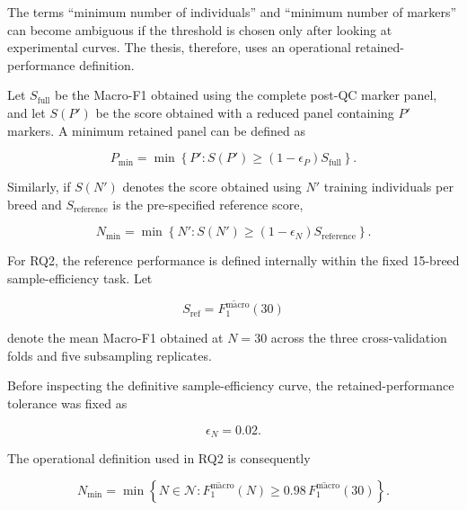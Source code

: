 The terms ``minimum number of individuals'' and ``minimum number of
markers'' can become ambiguous if the threshold is chosen only after
looking at experimental curves. The thesis, therefore, uses an
operational retained-performance definition.

Let $S_{\mathrm{full}}$ be the Macro-F1 obtained using the complete
post-QC marker panel, and let $S(P')$ be the score obtained with a
reduced panel containing $P'$ markers. A minimum retained panel can be
defined as

\begin{equation}
    P_{\min}
    =
    \min
    \left\{
        P':
        S(P')
        \geq
        (1-\epsilon_P)
        S_{\mathrm{full}}
    \right\}.
    \label{eq:minimum_marker_definition}
\end{equation}

Similarly, if $S(N')$ denotes the score obtained using $N'$ training
individuals per breed and $S_{\mathrm{reference}}$ is the pre-specified
reference score,

\begin{equation}
    N_{\min}
    =
    \min
    \left\{
        N':
        S(N')
        \geq
        (1-\epsilon_N)
        S_{\mathrm{reference}}
    \right\}.
    \label{eq:minimum_sample_definition}
\end{equation}

For RQ2, the reference performance is defined internally within the
fixed 15-breed sample-efficiency task. Let

\begin{equation}
    S_{\mathrm{ref}}
    =
    \overline{F_1^{\mathrm{macro}}}(30)
\end{equation}

denote the mean Macro-F1 obtained at $N=30$ across the three
cross-validation folds and five subsampling replicates.

Before inspecting the definitive sample-efficiency curve, the
retained-performance tolerance was fixed as

\begin{equation}
    \epsilon_N = 0.02.
\end{equation}

The operational definition used in RQ2 is consequently

\begin{equation}
    N_{\min}
    =
    \min
    \left\{
        N\in\mathcal{N}:
        \overline{F_1^{\mathrm{macro}}}(N)
        \geq
        0.98\,
        \overline{F_1^{\mathrm{macro}}}(30)
    \right\}.
    \label{eq:rq2_minimum_sample_definition}
\end{equation}


